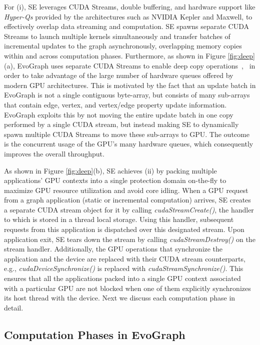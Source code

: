 For (i), SE leverages CUDA Streams, double buffering, and hardware support like \textit{Hyper-Qs} provided by the architectures such as NVIDIA Kepler and Maxwell, to effectively overlap data streaming and computation. SE spawns separate CUDA Streams to launch multiple kernels simultaneously and transfer batches of incremental updates to the graph asynchronously, overlapping memory copies within and across computation phases. Furthermore, as shown in Figure \ref{fig:deep}(a), EvoGraph uses separate CUDA Streams to enable deep copy operations~\cite{cuda7},~\cite{GraphReduce} in order to take advantage of the large number of hardware queues offered by modern GPU architectures. This is motivated by the fact that an update batch in EvoGraph is not a single contiguous byte-array, but consists of many sub-arrays that contain edge, vertex, and vertex/edge property update information. EvoGraph exploits this by not moving the entire update batch in one copy performed by a single CUDA stream, but instead making SE to dynamically spawn multiple CUDA Streams to move these sub-arrays to GPU. The outcome is the concurrent usage of the GPU's many hardware queues, which consequently improves the overall throughput. 

As shown in Figure \ref{fig:deep}(b), SE achieves (ii) by packing multiple applications' GPU contexts into a single protection domain on-the-fly to maximize GPU resource utilization and avoid core idling. When a GPU request from a graph application (static or incremental computation) arrives, SE creates a separate CUDA stream object for it by calling \textit{cudaStreamCreate()}, the handler to which is stored in a thread local storage. Using this handler, subsequent requests from this application is dispatched over this designated stream. Upon application exit, SE tears down the stream by calling \textit{cudaStreamDestroy()} on the stream handler. Additionally, the GPU operations that synchronize the application and the device are replaced with their CUDA stream counterparts, e.g., \textit{cudaDeviceSynchronize()} is replaced with \textit{cudaStreamSynchronize()}. This ensures that all the applications packed into a single GPU context associated with a particular GPU are not blocked when one of them explicitly synchronizes its host thread with the device. Next we discuss each computation phase in detail. 



\subsection{Computation Phases in EvoGraph}

